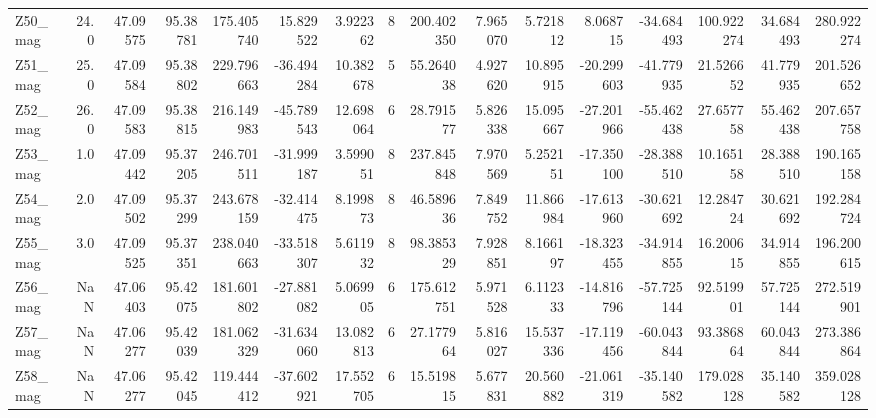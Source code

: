 \documentclass[11pt]{article}
\begin{document}
\begin{sidewaystable}
{\begin{tabular}{lrrrrrrrrrrrrrrr}
Z50\_mag &       24.0 &  47.09575 &  95.38781 &  175.405740 &  15.829522 &   3.922362 &   8 &  200.402350 &  7.965070 &   5.721812 &       8.068715 & -34.684493 &  100.922274 &    34.684493 &   280.922274 \\
Z51\_mag &       25.0 &  47.09584 &  95.38802 &  229.796663 & -36.494284 &  10.382678 &   5 &   55.264038 &  4.927620 &  10.895915 &     -20.299603 & -41.779935 &   21.526652 &    41.779935 &   201.526652 \\
Z52\_mag &       26.0 &  47.09583 &  95.38815 &  216.149983 & -45.789543 &  12.698064 &   6 &   28.791577 &  5.826338 &  15.095667 &     -27.201966 & -55.462438 &   27.657758 &    55.462438 &   207.657758 \\
Z53\_mag &        1.0 &  47.09442 &  95.37205 &  246.701511 & -31.999187 &   3.599051 &   8 &  237.845848 &  7.970569 &   5.252151 &     -17.350100 & -28.388510 &   10.165158 &    28.388510 &   190.165158 \\
Z54\_mag &        2.0 &  47.09502 &  95.37299 &  243.678159 & -32.414475 &   8.199873 &   8 &   46.589636 &  7.849752 &  11.866984 &     -17.613960 & -30.621692 &   12.284724 &    30.621692 &   192.284724 \\
Z55\_mag &        3.0 &  47.09525 &  95.37351 &  238.040663 & -33.518307 &   5.611932 &   8 &   98.385329 &  7.928851 &   8.166197 &     -18.323455 & -34.914855 &   16.200615 &    34.914855 &   196.200615 \\
Z56\_mag &        NaN &  47.06403 &  95.42075 &  181.601802 & -27.881082 &   5.069905 &   6 &  175.612751 &  5.971528 &   6.112333 &     -14.816796 & -57.725144 &   92.519901 &    57.725144 &   272.519901 \\
Z57\_mag &        NaN &  47.06277 &  95.42039 &  181.062329 & -31.634060 &  13.082813 &   6 &   27.177964 &  5.816027 &  15.537336 &     -17.119456 & -60.043844 &   93.386864 &    60.043844 &   273.386864 \\
Z58\_mag &        NaN &  47.06277 &  95.42045 &  119.444412 & -37.602921 &  17.552705 &   6 &   15.519815 &  5.677831 &  20.560882 &     -21.061319 & -35.140582 &  179.028128 &    35.140582 &   359.028128 \\
\bottomrule
\end{tabular}}
\end{sidewaystable}
    


    \begin{center}
    \end{center}
    { \hspace*{\fill} \\}
    
\end{document}
